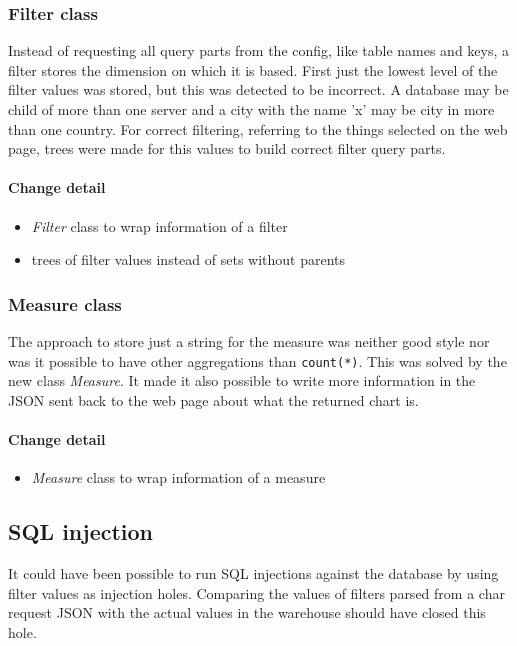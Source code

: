 \subsubsection{Filter class} 
Instead of requesting all query parts from the config, like table names and keys,
a filter stores the dimension on which it is based. First just the lowest
level of the filter values was stored, but this was detected to be incorrect.
A database may be child of more than one server and a city with the name 'x'
may be city in more than one country. For correct filtering, referring
to the things selected on the web page, trees were made for this values 
to build correct filter query parts.

\paragraph{Change detail}
\begin{itemize}
  \item \textit{Filter} class to wrap information of a filter
  \item trees of filter values instead of sets without parents
\end{itemize}


\subsubsection{Measure class}
The approach to store just a string for the measure was neither good style
nor was it possible to have other aggregations than \texttt{count(*)}.
This was solved by the new class \textit{Measure}. It made it also possible
to write more information in the JSON sent back to the web page about what
the returned chart is.

\paragraph{Change detail}
\begin{itemize}
  \item \textit{Measure} class to wrap information of a measure
\end{itemize}

\subsection{SQL injection}\label{inj}
It could have been possible to run SQL injections against the database
by using filter values as injection holes. Comparing the values of filters
parsed from a char request JSON with the actual values in the warehouse
should have closed this hole.

